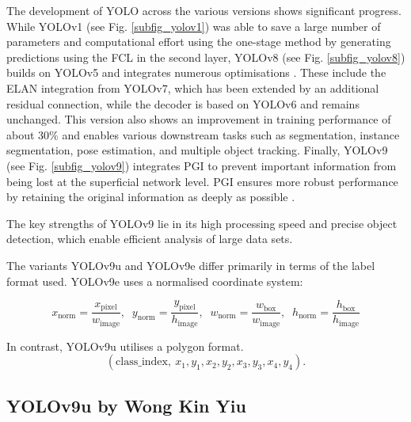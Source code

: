 The development of \acrshort{YOLO} across the various versions shows significant progress. While \acrshort{YOLO}v1 (see Fig. \ref{subfig_yolov1}) was able to save a large number of parameters and computational effort using the one-stage method by generating predictions using the \acrshort{FCL} in the second layer, \acrshort{YOLO}v8 (see Fig. \ref{subfig_yolov8}) builds on \acrshort{YOLO}v5 and integrates numerous optimisations \cite{Wang2024_yolo_review}. These include the \acrfull{ELAN} integration from \acrshort{YOLO}v7, which has been extended by an additional residual connection, while the decoder is based on \acrshort{YOLO}v6 and remains unchanged. This version also shows an improvement in training performance of about 30\% and enables various downstream tasks such as segmentation, instance segmentation, pose estimation, and multiple object tracking. Finally, \acrshort{YOLO}v9 (see Fig. \ref{subfig_yolov9}) integrates \acrshort{PGI} to prevent important information from being lost at the superficial network level. \acrshort{PGI} ensures more robust performance by retaining the original information as deeply as possible \cite{Wang2024_yolo_review}.

The key strengths of \acrshort{YOLO}v9 lie in its high processing speed and precise object detection, which enable efficient analysis of large data sets.
 
The variants \acrshort{YOLO}v9u and \acrshort{YOLO}v9e differ primarily in terms of the label format used. \acrshort{YOLO}v9e uses a normalised coordinate system:

\hypertarget{eq:yolov9}{}
\begin{equation}
x_\text{norm} = \frac{x_\text{pixel}}{w_\text{image}},\;\;
y_\text{norm} = \frac{y_\text{pixel}}{h_\text{image}},\;\;
w_\text{norm} = \frac{w_\text{box}}{w_\text{image}},\;\;
h_\text{norm} = \frac{h_\text{box}}{h_\text{image}}
\end{equation}
\label{Eq:yolov9}

\hypertarget{eq:yolov9u}{}
In contrast, \acrshort{YOLO}v9u utilises a polygon format.
\begin{equation}
(\text{class\_index},\ x_1, y_1, x_2, y_2, x_3, y_3, x_4, y_4).
\end{equation}



\subsection{YOLOv9u by Wong Kin Yiu}
\label{subsec:yolov9u}

